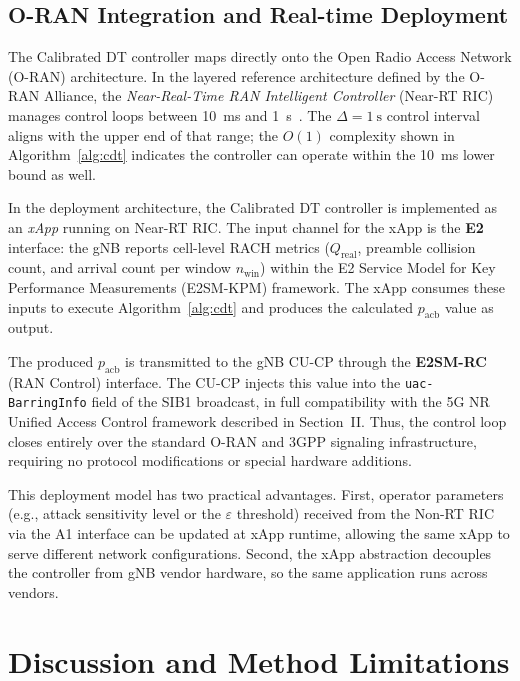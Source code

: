 \documentclass[conference]{IEEEtran}
\newcommand{\qreal}{Q_{\mathrm{real}}}
\newcommand{\pacb}{p_{\mathrm{acb}}}
\begin{document}
\subsection{O-RAN Integration and Real-time Deployment}

The Calibrated DT controller maps directly onto the Open Radio Access Network (O-RAN) architecture. In the layered reference architecture defined by the O-RAN Alliance, the \emph{Near-Real-Time RAN Intelligent Controller} (Near-RT RIC) manages control loops between 10~ms and 1~s~\cite{b14}. The $\Delta = 1\ \mathrm{s}$ control interval aligns with the upper end of that range; the $O(1)$ complexity shown in Algorithm~\ref{alg:cdt} indicates the controller can operate within the 10~ms lower bound as well.

In the deployment architecture, the Calibrated DT controller is implemented as an \emph{xApp} running on Near-RT RIC. The input channel for the xApp is the \textbf{E2} interface: the gNB reports cell-level RACH metrics ($\qreal$, preamble collision count, and arrival count per window $n_{\mathrm{win}}$) within the E2 Service Model for Key Performance Measurements (E2SM-KPM) framework. The xApp consumes these inputs to execute Algorithm~\ref{alg:cdt} and produces the calculated $\pacb$ value as output.

The produced $\pacb$ is transmitted to the gNB CU-CP through the \textbf{E2SM-RC} (RAN Control) interface. The CU-CP injects this value into the \texttt{uac-BarringInfo} field of the SIB1 broadcast, in full compatibility with the 5G NR Unified Access Control framework described in Section~II. Thus, the control loop closes entirely over the standard O-RAN and 3GPP signaling infrastructure, requiring no protocol modifications or special hardware additions.

This deployment model has two practical advantages. First, operator parameters (e.g., attack sensitivity level or the $\varepsilon$ threshold) received from the Non-RT RIC via the A1 interface can be updated at xApp runtime, allowing the same xApp to serve different network configurations. Second, the xApp abstraction decouples the controller from gNB vendor hardware, so the same application runs across vendors.

\section{Discussion and Method Limitations}
\end{document}
